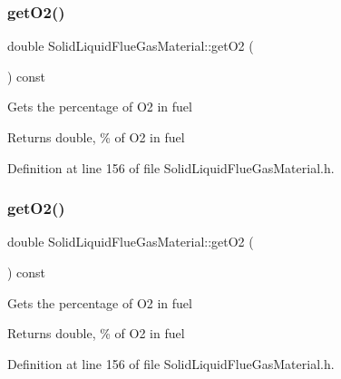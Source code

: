 \subsubsection{\texorpdfstring{get\+O2()}{getO2()}\hspace{0.1cm}{\footnotesize\ttfamily [1/3]}}
{\footnotesize\ttfamily double Solid\+Liquid\+Flue\+Gas\+Material\+::get\+O2 (\begin{DoxyParamCaption}{ }\end{DoxyParamCaption}) const\hspace{0.3cm}{\ttfamily [inline]}}

Gets the percentage of O2 in fuel \begin{DoxyReturn}{Returns}
double, \% of O2 in fuel 
\end{DoxyReturn}


Definition at line 156 of file Solid\+Liquid\+Flue\+Gas\+Material.\+h.

\mbox{\label{class_solid_liquid_flue_gas_material_a08d588e576f605d3f9925cb649e1105e}} 
\subsubsection{\texorpdfstring{get\+O2()}{getO2()}\hspace{0.1cm}{\footnotesize\ttfamily [2/3]}}
{\footnotesize\ttfamily double Solid\+Liquid\+Flue\+Gas\+Material\+::get\+O2 (\begin{DoxyParamCaption}{ }\end{DoxyParamCaption}) const\hspace{0.3cm}{\ttfamily [inline]}}

Gets the percentage of O2 in fuel \begin{DoxyReturn}{Returns}
double, \% of O2 in fuel 
\end{DoxyReturn}


Definition at line 156 of file Solid\+Liquid\+Flue\+Gas\+Material.\+h.

\mbox{\label{class_solid_liquid_flue_gas_material_a08d588e576f605d3f9925cb649e1105e}} 
